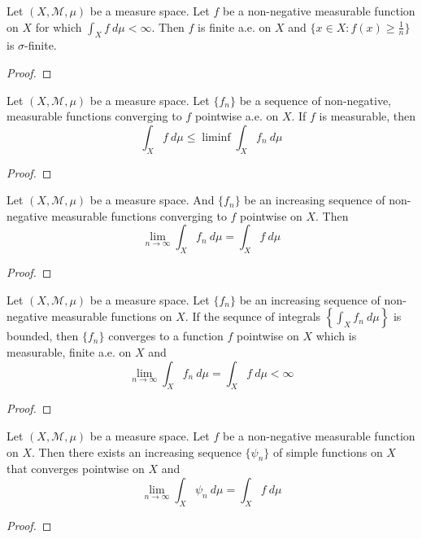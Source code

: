 \begin{theorem}
	Let $(X,\mathcal{M},\mu)$ be a measure space.
	Let $f$ be a non-negative measurable function on $X$ for which $\int_X f \ d\mu < \infty$.
	Then $f$ is finite a.e. on $X$ and $\{ x \in X : f(x) \ge \frac{1}{n}\}$ is $\sigma$-finite.
\end{theorem}
\begin{proof}
\end{proof}

\begin{lemma}[Fatou]
	Let $(X,\mathcal{M},\mu)$ be a measure space.
	Let $\{ f_n \}$ be a sequence of non-negative, measurable functions converging to $f$ pointwise a.e. on $X$.
	If $f$ is measurable, then
	$$ \int_X f\ d\mu \le \liminf \int_X f_n \ d\mu $$
\end{lemma}
\begin{proof}
\end{proof}

\begin{theorem}
	Let $(X,\mathcal{M},\mu)$ be a measure space.
	And $\{ f_n \}$ be an increasing sequence of non-negative measurable functions converging to $f$ pointwise on $X$.
	Then
	$$ \lim_{n \to \infty} \int_X f_n \ d\mu = \int_X f\ d\mu $$
\end{theorem}
\begin{proof}
\end{proof}

\begin{lemma}
	Let $(X,\mathcal{M},\mu)$ be a measure space.
	Let $\{ f_n \}$ be an increasing sequence of non-negative measurable functions on $X$.
	If the sequnce of integrals $\displaystyle \left\{ \int_X f_n \ d\mu \right\}$ is bounded, then $\{ f_n \}$ converges to a function $f$ pointwise on $X$ which is measurable, finite a.e. on $X$ and 
	$$ \lim_{n \to \infty} \int_X f_n \ d\mu = \int_X f \ d\mu < \infty $$
\end{lemma}
\begin{proof}
\end{proof}

\begin{theorem}
	Let $(X,\mathcal{M},\mu)$ be a measure space.
	Let $f$ be a non-negative measurable function on $X$.
	Then there exists an increasing sequence $\{ \psi_n \}$ of simple functions on $X$ that converges pointwise on $X$ and 
	$$ \lim_{n \to \infty} \int_X \psi_n \ d\mu = \int_X f \ d\mu $$
\end{theorem}
\begin{proof}
\end{proof}

